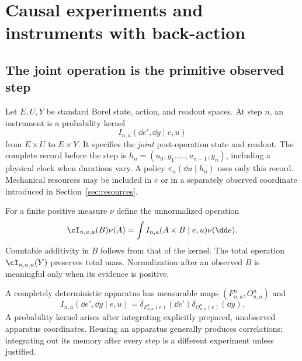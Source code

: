 \section{Causal experiments and instruments with back-action}\label{sec:instruments}
\subsection{The joint operation is the primitive observed step}
Let $E,U,Y$ be standard Borel state, action, and readout spaces. At step $n$, an instrument is a probability kernel
\[
 I_{n,a}(\dd e',\dd y\mid e,u)
\]
from $E\times U$ to $E\times Y$. It specifies the \emph{joint} post-operation state and readout. The complete record before the step is
$h_n=(u_0,y_1,\ldots,u_{n-1},y_n)$, including a physical clock when durations vary. A policy $\pi_n(\dd u\mid h_n)$ uses only this record. Mechanical resources may be included in $e$ or in a separately observed coordinate introduced in Section~\ref{sec:resources}.

For a finite positive measure $\nu$ define the unnormalized operation
\[
 \cI_{n,a,u}(B)\nu(A)
 =\int I_{n,a}(A\times B\mid e,u)\nu(\dd e).
\]
Countable additivity in $B$ follows from that of the kernel. The total operation $\cI_{n,a,u}(Y)$ preserves total mass. Normalization after an observed $B$ is meaningful only when its evidence is positive.

A completely deterministic apparatus has measurable maps $(F_{n,a}^u,O_{n,a}^u)$ and
\[
 I_{n,a}(\dd e',\dd y\mid e,u)
 =\delta_{F_{n,a}^u(e)}(\dd e')\delta_{O_{n,a}^u(e)}(\dd y).
\]
A probability kernel arises after integrating explicitly prepared, unobserved apparatus coordinates. Reusing an apparatus generally produces correlations; integrating out its memory after every step is a different experiment unless justified.

